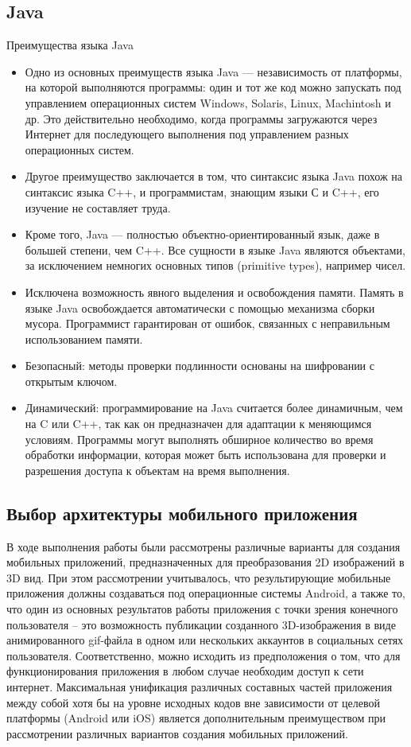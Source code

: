 \subsection{Java}
Преимущества языка Java
\begin{itemize}
	\item Одно из основных преимуществ языка Java — независимость от платформы, на которой выполняются программы: один и тот же код можно запускать под управлением операционных систем Windows, Solaris, Linux, Machintosh и др. 
	Это действительно необходимо, когда программы загружаются через Интернет для последующего выполнения под управлением разных операционных систем.
	\item Другое преимущество заключается в том, что синтаксис языка Java похож на синтаксис языка C++, и программистам, знающим языки С и C++, его изучение не составляет труда.
	\item Кроме того, Java — полностью объектно-ориентированный язык, даже в большей степени, чем C++. Все сущности в языке Java являются объектами, за исключением немногих основных типов (primitive types), например чисел.
	\item Исключена возможность явного выделения и освобождения памяти.	Память в языке Java освобождается автоматически с помощью механизма сборки мусора. Программист гарантирован от ошибок, связанных с неправильным использованием памяти.
	\item Безопасный: методы проверки подлинности основаны на шифровании с открытым ключом.
	\item Динамический: программирование на Java считается более динамичным, чем на C или C++, так как он предназначен для адаптации к меняющимся условиям. Программы могут выполнять обширное количество во время обработки информации, которая может быть использована для проверки и разрешения доступа к объектам на время выполнения.
\end{itemize}

\subsection{Выбор архитектуры мобильного приложения}
В ходе выполнения работы были рассмотрены различные варианты для создания мобильных приложений, предназначенных для преобразования 2D изображений в 3D вид. При этом рассмотрении учитывалось, что результирующие мобильные приложения должны создаваться под операционные системы Android, а также то, что один из основных результатов работы приложения с точки зрения конечного пользователя – это возможность публикации созданного 3D-изображения в виде анимированного gif-файла в одном или нескольких аккаунтов в социальных сетях пользователя. Соответственно, можно исходить из предположения о том, что для функционирования приложения в любом случае необходим доступ к сети интернет. Максимальная унификация различных составных частей приложения между собой хотя бы на уровне исходных кодов вне зависимости от целевой платформы (Android или iOS) является дополнительным преимуществом при рассмотрении различных вариантов создания мобильных приложений.

